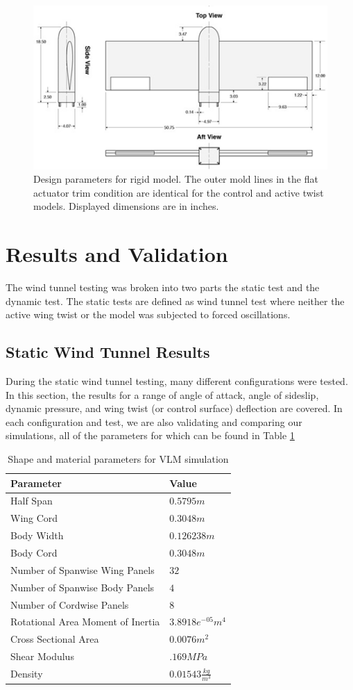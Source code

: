 \documentclass[11pt]{ucthesis}
\begin{document}
\begin{figure}[thpb]
\centering
\includegraphics[width=0.7\linewidth]{Figures/rigidModel.png}
\caption{Design parameters for rigid model. The outer mold lines in the flat actuator trim condition are identical for the control and active twist models. Displayed dimensions are in inches.}
\label{fig:rigid}
\end{figure}

\section{Results and Validation}
The wind tunnel testing was broken into two parts the static test and the dynamic test. The static tests are defined as wind tunnel test where neither the active wing twist or the model was subjected to forced oscillations. 

\subsection{Static Wind Tunnel Results}
During the static wind tunnel testing, many different configurations were tested. In this section, the results for a range of angle of attack, angle of sideslip, dynamic pressure, and wing twist (or control surface) deflection are covered. In each configuration and test, we are also validating and comparing our simulations, all of the parameters for which can be found in Table \ref{tab:vlmConfig}

\begin{table}[h]
\begin{center}
\caption{Shape and material parameters for VLM simulation}
\label{tab:vlmConfig}
\begin{tabular}{  p{6cm} p{1.9cm}}
Parameter&Value\\\hline
Half Span&$0.5795m$\\
Wing Cord&$0.3048m$\\
Body Width&$0.126238m$\\
Body Cord&$0.3048m$\\
Number of Spanwise Wing Panels&$32$\\
Number of Spanwise Body Panels&$4$\\
Number of Cordwise Panels&$8$\\
Rotational Area Moment of Inertia&$3.8918e^{-05}m^4$\\
Cross Sectional Area&$0.0076m^2$\\
Shear Modulus&$.169 MPa$\\
Density&$0.01543\frac{kg}{m^3}$\\
\end{tabular}
\end{center}
\end{table}  
\end{document}
